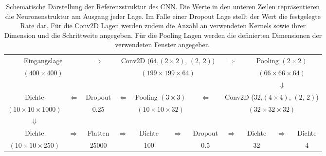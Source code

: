 \begin{table}[!b]
\centering
\footnotesize
 \begin{tabular}{|c|c|c|c|c|c|c|c|c|c|c|}
 \cline{1-2} \cline{4-7} \cline{9-11}
 \multicolumn{2}{|c|}{Eingangslage} & \multirow{2}{*}{$\Rightarrow$} & \multicolumn{4}{c|}{Conv2D (64,$(2\times 2)$, $(2,\,2)$)}&\multirow{2}{*}{$\Rightarrow$} & \multicolumn{3}{c|}{Pooling $(2\times 2)$} \\
 \cline{1-2} \cline{4-7} \cline{9-11}
 \multicolumn{2}{|c|}{$(400 \times 400)$} & & \multicolumn{4}{c|}{$(199 \times 199 \times 64)$} & & \multicolumn{3}{c|}{$(66 \times 66 \times 64)$} \\
 \cline{1-2} \cline{4-7} \cline{9-11}
 \multicolumn{8}{c}{}& \multicolumn{3}{c}{$\Downarrow$} \\
 \cline{1-1} \cline{3-3} \cline{5-6} \cline{8-11}
 Dichte & \multirow{2}{*}{$\Leftarrow$} & Dropout & \multirow{2}{*}{$\Leftarrow$} & \multicolumn{2}{c|}{Pooling $(3\times 3)$} &\multirow{2}{*}{$\Leftarrow$}  & \multicolumn{4}{c|}{Conv2D (32,$(4\times 4)$, $(2,\,2)$)} \\
 \cline{1-1} \cline{3-3} \cline{5-6} \cline{8-11}
 $(10\times 10\times 1000)$ & & 0.25 & &  \multicolumn{2}{c|}{$(10\times 10 \times 32)$} & & \multicolumn{4}{c|}{$(32 \times 32 \times 32)$} \\
 \cline{1-1} \cline{3-3} \cline{5-6} \cline{8-11}
 \multicolumn{1}{c}{ $\Downarrow$}& \multicolumn{10}{c}{} \\
  \cline{1-1} \cline{3-3} \cline{5-5} \cline{7-7} \cline{9-9} \cline{11-11}
  Dichte  & \multirow{2}{*}{$\Rightarrow$} & Flatten & \multirow{2}{*}{$\Rightarrow$} & Dichte & \multirow{2}{*}{$\Rightarrow$} & Dropout & \multirow{2}{*}{$\Rightarrow$} & Dichte & \multirow{2}{*}{$\Rightarrow$} & Dichte \\
  \cline{1-1} \cline{3-3} \cline{5-5} \cline{7-7} \cline{9-9} \cline{11-11}
  $(10\times 10\times 250)$ & &  25000 & & 100 & &0.5 & &32& & 4 \\
  \cline{1-1} \cline{3-3} \cline{5-5} \cline{7-7} \cline{9-9} \cline{11-11}
 \end{tabular}
 \caption{Schematische Darstellung der Referenzstruktur des CNN. Die Werte in den unteren Zeilen repräsentieren die Neuronenstruktur am Ausgang jeder Lage. Im Falle einer Dropout Lage stellt der Wert die festgelegte Rate dar. Für die Conv2D Lagen werden zudem die Anzahl an verwendeten Kernels sowie ihrer Dimension und die Schrittweite angegeben. Für die Pooling Lagen werden die definierten Dimensionen der verwendeten Fenster angegeben.}
 \label{fig:refstrukt}
\end{table}
